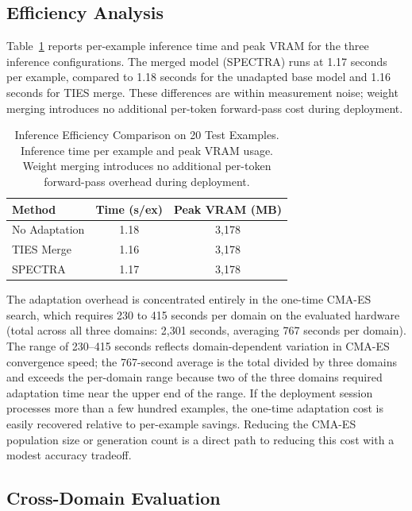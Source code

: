 \documentclass[preprint,12pt]{elsarticle}
\begin{document}
\subsection{Efficiency Analysis}
\label{subsec:efficiency}

Table~\ref{tab:efficiency} reports per-example inference time and peak VRAM
for the three inference configurations. The merged model (SPECTRA) runs at
1.17 seconds per example, compared to 1.18 seconds for the unadapted base
model and 1.16 seconds for TIES merge. These differences are within measurement
noise; weight merging introduces no additional per-token forward-pass cost
during deployment.

\begin{table}[t]
\centering
\caption{Inference Efficiency Comparison on 20 Test Examples. Inference time per example and peak VRAM usage. Weight merging introduces no additional per-token forward-pass overhead during deployment.}
\label{tab:efficiency}
\begin{tabular}{lcc}
\toprule
\textbf{Method} & \textbf{Time (s/ex)} & \textbf{Peak VRAM (MB)} \\
\midrule
No Adaptation & 1.18 & 3,178 \\
TIES Merge    & 1.16 & 3,178 \\
SPECTRA       & 1.17 & 3,178 \\
\bottomrule
\end{tabular}
\end{table}

The adaptation overhead is concentrated entirely in the one-time CMA-ES search,
which requires 230 to 415 seconds per domain on the evaluated hardware (total
across all three domains: 2,301 seconds, averaging 767 seconds per domain).
The range of 230--415 seconds reflects domain-dependent variation in CMA-ES
convergence speed; the 767-second average is the total divided by three domains
and exceeds the per-domain range because two of the three domains required
adaptation time near the upper end of the range. If the deployment session
processes more than a few hundred examples, the one-time adaptation cost is
easily recovered relative to per-example savings. Reducing the CMA-ES
population size or generation count is a direct path to reducing this cost
with a modest accuracy tradeoff.

\subsection{Cross-Domain Evaluation}
\label{subsec:crossdomain}
\end{document}
